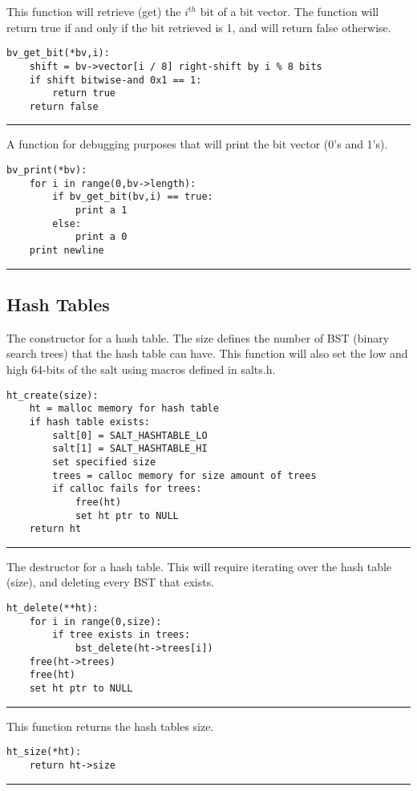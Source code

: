 \documentclass[
	12pt, %
]{fphw}
\begin{document}
This function will retrieve (get) the $i^{th}$ bit of a bit vector. The function will return true if and only if the bit retrieved is 1, and will return false otherwise.
\begin{lstlisting}[mathescape=true]
bv_get_bit(*bv,i):
	shift = bv->vector[i / 8] right-shift by i % 8 bits
	if shift bitwise-and 0x1 == 1:
		return true
	return false
\end{lstlisting}
\noindent\rule{6.3in}{0.4pt}

A function for debugging purposes that will print the bit vector (0's and 1's).
\begin{lstlisting}[mathescape=true]
bv_print(*bv):
	for i in range(0,bv->length):
		if bv_get_bit(bv,i) == true:
			print a 1
		else:
			print a 0
	print newline
\end{lstlisting}
\noindent\rule{6.3in}{0.4pt}

\subsection{Hash Tables}

The constructor for a hash table. The size defines the number of BST (binary search trees) that the hash table can have. This function will also set the low and high 64-bits of the salt using macros defined in salts.h.
\begin{lstlisting}[mathescape=true]
ht_create(size):
	ht = malloc memory for hash table
	if hash table exists:
		salt[0] = SALT_HASHTABLE_LO
		salt[1] = SALT_HASHTABLE_HI
		set specified size
		trees = calloc memory for size amount of trees
		if calloc fails for trees:
			free(ht)
			set ht ptr to NULL
	return ht
\end{lstlisting}
\noindent\rule{6.3in}{0.4pt}

The destructor for a hash table. This will require iterating over the hash table (size), and deleting every BST that exists.
\begin{lstlisting}[mathescape=true]
ht_delete(**ht):
	for i in range(0,size):
		if tree exists in trees:
			bst_delete(ht->trees[i])
	free(ht->trees)
	free(ht)
	set ht ptr to NULL
\end{lstlisting}
\noindent\rule{6.3in}{0.4pt}

This function returns the hash tables size.
\begin{lstlisting}[mathescape=true]
ht_size(*ht):
	return ht->size
\end{lstlisting}
\noindent\rule{6.3in}{0.4pt}
\end{document}
